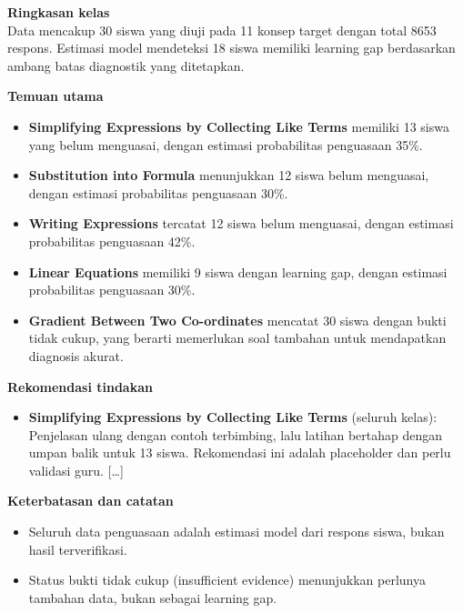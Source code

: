 \documentclass[11pt,a4paper]{article}
\begin{document}
\begin{tcolorbox}[colback=white, colframe=accent, boxrule=0.5pt, arc=2pt, fontupper=\small,
                  title={\small Laporan guru -- dihasilkan \texttt{gemini-3.1-flash-lite}}, coltitle=white, colbacktitle=accent]
  \textbf{Ringkasan kelas}\\
  Data mencakup 30 siswa yang diuji pada 11 konsep target dengan total 8653 respons. Estimasi model mendeteksi 18
  siswa memiliki learning gap berdasarkan ambang batas diagnostik yang ditetapkan.

  \textbf{Temuan utama}
  \begin{itemize}
    \item \textbf{Simplifying Expressions by Collecting Like Terms} memiliki 13 siswa yang belum menguasai, dengan
          estimasi probabilitas penguasaan 35\%.
    \item \textbf{Substitution into Formula} menunjukkan 12 siswa belum menguasai, dengan estimasi probabilitas
          penguasaan 30\%.
    \item \textbf{Writing Expressions} tercatat 12 siswa belum menguasai, dengan estimasi probabilitas penguasaan 42\%.
    \item \textbf{Linear Equations} memiliki 9 siswa dengan learning gap, dengan estimasi probabilitas penguasaan 30\%.
    \item \textbf{Gradient Between Two Co-ordinates} mencatat 30 siswa dengan bukti tidak cukup, yang berarti
          memerlukan soal tambahan untuk mendapatkan diagnosis akurat.
  \end{itemize}

  \textbf{Rekomendasi tindakan}
  \begin{itemize}
    \item \textbf{Simplifying Expressions by Collecting Like Terms} (seluruh kelas): Penjelasan ulang dengan contoh
          terbimbing, lalu latihan bertahap dengan umpan balik untuk 13 siswa. Rekomendasi ini adalah placeholder dan
          perlu validasi guru. [\dots]
  \end{itemize}

  \textbf{Keterbatasan dan catatan}
  \begin{itemize}
    \item Seluruh data penguasaan adalah estimasi model dari respons siswa, bukan hasil terverifikasi.
    \item Status bukti tidak cukup (insufficient evidence) menunjukkan perlunya tambahan data, bukan sebagai learning gap.
  \end{itemize}
\end{tcolorbox}
\end{document}
